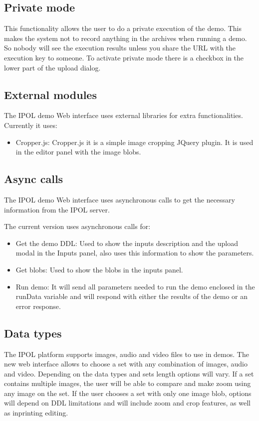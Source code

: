 \subsection{Private mode}
This functionality allows the user to do a private execution of the demo. This makes the system not to record anything in the archives when running 
a demo. So nobody will see the execution results unless you share the URL with the execution key to someone. To activate private 
mode there is a checkbox in the lower part of the upload dialog.

\subsection{External modules}

The IPOL demo Web interface uses external libraries for extra functionalities.
Currently it uses:

\begin{itemize}
\item Cropper.js: Cropper.js it is a simple image cropping JQuery plugin. It is used in the editor panel with the image blobs.
\end{itemize}


\subsection{Async calls}
The IPOL demo Web interface uses asynchronous calls to get the necessary information from the IPOL server.

The current version uses asynchronous calls for:
\begin{itemize}
\item Get the demo DDL: Used to show the inputs description and the upload modal in the Inputs panel, also uses this information to show the parameters.
\item Get blobs: Used to show the blobs in the inputs panel.
\item Run demo: It will send all parameters needed to run the demo enclosed in the runData variable and will respond with either the results of 
the demo or an error response.
\end{itemize}


\subsection{Data types}
The IPOL platform supports images, audio and video files to use in demos. The new web interface 
allows to choose a set with any combination of images, audio and video. Depending on the data types and sets length options will vary. 
If a set contains multiple images, the user will be able to compare and make zoom using any image on the set. If the user chooses a set with only 
one image blob, options will depend on DDL limitations and will include zoom and crop features, as well as inprinting editing.

